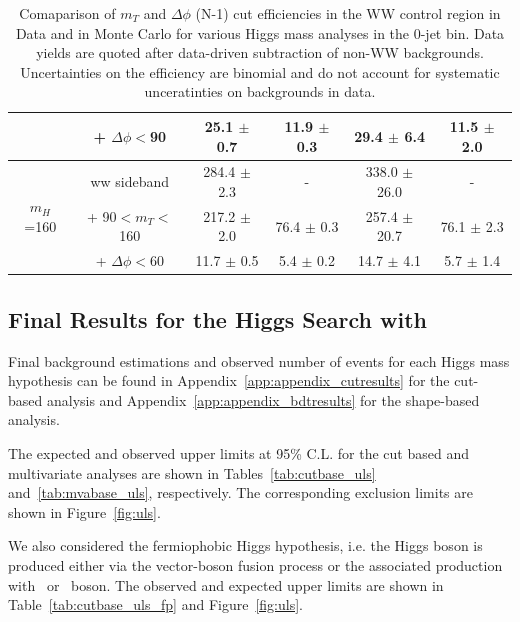 \begin{table}[!hbp]
\begin{center}
\begin{tabular}{c c c c c c}
                            & + $\Delta\phi<$90  &   25.1 $\pm$   0.7 &   11.9 $\pm$   0.3 &  29.4 $\pm$   6.4 &   11.5 $\pm$   2.0 \\
\hline                                                                                                                                
\multirow{3}{*}{$m_H$=160} & ww sideband  &  284.4 $\pm$   2.3 &  - & 338.0 $\pm$  26.0 &  - \\                                
                                   & + 90$<m_T<$160  &  217.2 $\pm$   2.0 &   76.4 $\pm$   0.3 & 257.4 $\pm$  20.7 &   76.1 $\pm$   2.3 \\
                            & + $\Delta\phi<$60  &   11.7 $\pm$   0.5 &    5.4 $\pm$   0.2 &  14.7 $\pm$   4.1 &    5.7 $\pm$   1.4 \\
\hline
\end{tabular}
\caption{Comaparison of $m_T$ and $\Delta\phi$ (N-1) cut efficiencies in the WW control region in Data and in Monte Carlo for various Higgs mass analyses in the 0-jet bin.
Data yields are quoted after data-driven subtraction of non-WW backgrounds.
Uncertainties on the efficiency are binomial and do not account for systematic unceratinties on backgrounds in data.}
\label{tab:wweffside}
\end{center}
\end{table}

\clearpage
\subsection{Final Results for the Higgs Search with \intlumi{}}
\label{sec:search_results}

Final background estimations and observed number of events for each
Higgs mass hypothesis can be found in
Appendix~\vref{app:appendix_cutresults} for the cut-based analysis and
Appendix~\vref{app:appendix_bdtresults} for the shape-based analysis.

The expected and observed upper limits at 95\% C.L. for the cut based and
multivariate analyses are shown in Tables~\ref{tab:cutbase_uls}
and~\ref{tab:mvabase_uls}, respectively. The corresponding exclusion
limits are shown in Figure~\ref{fig:uls}.

We also considered the fermiophobic Higgs hypothesis, i.e. the Higgs
boson is produced either via the vector-boson fusion process or the
associated production with \W\ or \Z\ boson. The observed and expected
upper limits are shown in Table~\ref{tab:cutbase_uls_fp} and
Figure~\ref{fig:uls}.

